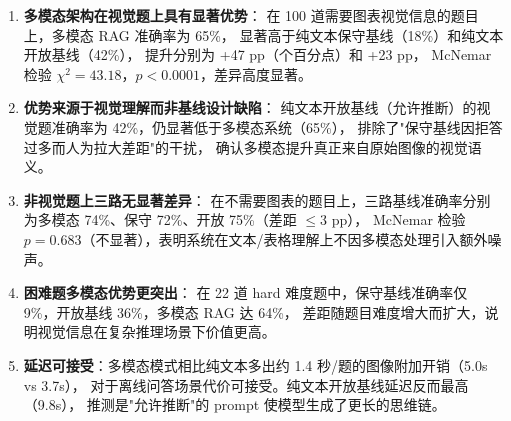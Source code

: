 ﻿\documentclass[UTF8, heading=true]{ctexart}
\begin{document}
\begin{enumerate}
    \item \textbf{多模态架构在视觉题上具有显著优势}：
          在 100 道需要图表视觉信息的题目上，多模态 RAG 准确率为 65\%，
          显著高于纯文本保守基线（18\%）和纯文本开放基线（42\%），
          提升分别为 +47 pp（个百分点）和 +23 pp，
          McNemar 检验 $\chi^2=43.18$，$p<0.0001$，差异高度显著。

    \item \textbf{优势来源于视觉理解而非基线设计缺陷}：
          纯文本开放基线（允许推断）的视觉题准确率为 42\%，仍显著低于多模态系统（65\%），
          排除了"保守基线因拒答过多而人为拉大差距"的干扰，
          确认多模态提升真正来自原始图像的视觉语义。

    \item \textbf{非视觉题上三路无显著差异}：
          在不需要图表的题目上，三路基线准确率分别为多模态 74\%、保守 72\%、开放 75\%（差距 $\leq 3$ pp），
          McNemar 检验 $p=0.683$（不显著），表明系统在文本/表格理解上不因多模态处理引入额外噪声。

    \item \textbf{困难题多模态优势更突出}：
          在 22 道 hard 难度题中，保守基线准确率仅 9\%，开放基线 36\%，多模态 RAG 达 64\%，
          差距随题目难度增大而扩大，说明视觉信息在复杂推理场景下价值更高。

    \item \textbf{延迟可接受}：多模态模式相比纯文本多出约 1.4 秒/题的图像附加开销（5.0s vs 3.7s），
          对于离线问答场景代价可接受。纯文本开放基线延迟反而最高（9.8s），
          推测是"允许推断"的 prompt 使模型生成了更长的思维链。
\end{enumerate}
\end{document}
